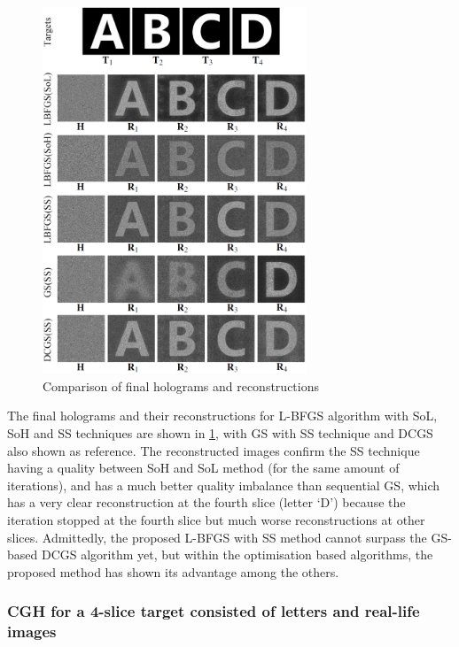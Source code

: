 \begin{figure}[H]
	\centering
	\includegraphics[width=0.7\textwidth]{final_holograms_reconstructions_4_slice}
	\caption{Comparison of final holograms and reconstructions}
	\label{fig:3D_ABCD}
\end{figure}

The final holograms and their reconstructions for L-BFGS algorithm with SoL, SoH and SS techniques are shown in \cref{fig:3D_ABCD}, with GS with SS technique and DCGS also shown as reference. The reconstructed images confirm the SS technique having a quality between SoH and SoL method (for the same amount of iterations), and has a much better quality imbalance than sequential GS, which has a very clear reconstruction at the fourth slice (letter `D') because the iteration stopped at the fourth slice but much worse reconstructions at other slices. Admittedly, the proposed L-BFGS with SS method cannot surpass the GS-based DCGS algorithm yet, but within the optimisation based algorithms, the proposed method has shown its advantage among the others.



\subsubsection{CGH for a 4-slice target consisted of letters and real-life images}

